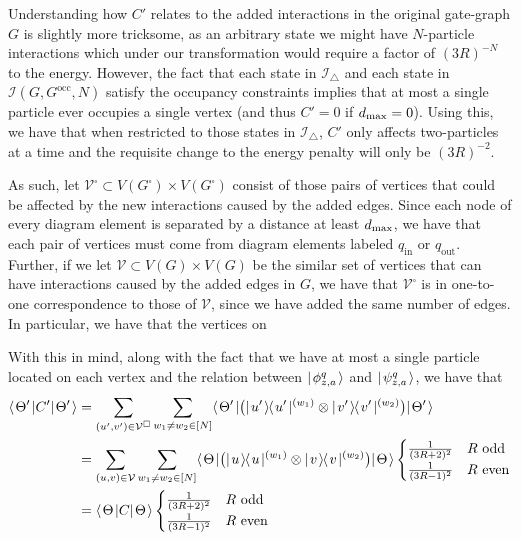 \documentclass[../thesis-main/thesis-main]{subfiles}
\begin{document}
Understanding how $C'$ relates to the added interactions in the original gate-graph $G$ is slightly more tricksome, as an arbitrary state we might have $N$-particle interactions which under our transformation would require a factor of $(3R)^{-N}$ to the energy.  However, the fact that each state in $\mathcal{I}_{\triangle}$ and each state in $\mathcal{I}(G,G^{\text{occ}},N)$ satisfy the occupancy constraints implies that at most a single particle ever occupies a single vertex (and thus $C'=0$ if $d_{\text{max}} = 0$).  Using this, we have that when restricted to those states in $\mathcal{I}_{\triangle}$, $C'$ only affects two-particles at a time and the requisite change to the energy penalty will only be $(3R)^{-2}$.

As such, let $\mathcal{V}^{\square} \subset V(G^\square)\times V(G^\square)$ consist of those pairs of vertices that could be affected by the new interactions caused by the added edges.  Since each node of every diagram element is separated by a distance at least $d_{\text{max}}$, we have that each pair of vertices must come from diagram elements labeled $q_{\text{in}}$ or $q_{\text{out}}$.  Further, if we let $\mathcal{V}\subset V(G)\times V(G)$ be the similar set of vertices that can have interactions caused by the added edges in $G$, we have that $\mathcal{V}^{\square}$ is in one-to-one correspondence to those of $\mathcal{V}$, since we have added the same number of edges.  In particular, we have that the vertices on 

With this in mind, along with the fact that we have at most a single particle located on each vertex and the relation between $|\mspace{2mu} \phi_{z,a}^q \mspace{2mu} \rangle$ and $|\mspace{2mu} \psi_{z,a}^q \mspace{2mu} \rangle$, we have that 
\begin{align}
  \langle\mspace{2mu} \Theta' \mspace{2mu} | C' |\mspace{2mu} \Theta' \mspace{2mu} \rangle &= \sum_{(u',v')\in \mathcal{V}^\square} \sum_{w_1\neq w_2\in [N]} \langle\mspace{2mu} \Theta' \mspace{2mu} | \big(|\mspace{2mu} u' \mspace{2mu} \rangle\mspace{-2mu}\langle\mspace{2mu} u' \mspace{2mu} |^{(w_1)} \otimes |\mspace{2mu} v' \mspace{2mu} \rangle\mspace{-2mu}\langle\mspace{2mu} v' \mspace{2mu} |^{(w_2)}\big) |\mspace{2mu} \Theta' \mspace{2mu} \rangle\\
   &= \sum_{(u,v)\in \mathcal{V}} \sum_{w_1\neq w_2\in [N]} \langle\mspace{2mu} \Theta \mspace{2mu} |\big(|\mspace{2mu} u \mspace{2mu} \rangle\mspace{-2mu}\langle\mspace{2mu} u \mspace{2mu} |^{(w_1)} \otimes |\mspace{2mu} v \mspace{2mu} \rangle\mspace{-2mu}\langle\mspace{2mu} v \mspace{2mu} |^{(w_2)}\big) |\mspace{2mu} \Theta \mspace{2mu} \rangle
     \begin{cases}
       \frac{1}{(3R+2)^2} & R\text{ odd}\\
       \frac{1}{(3R-1)^2} & R\text{ even}
    \end{cases}\\
  &= \langle\mspace{2mu} \Theta \mspace{2mu} | C |\mspace{2mu} \Theta \mspace{2mu} \rangle \begin{cases}
       \frac{1}{(3R+2)^2} & R\text{ odd}\\
       \frac{1}{(3R-1)^2} & R\text{ even}
    \end{cases}
    \label{eq:C' relation}
\end{align}
\end{document}
